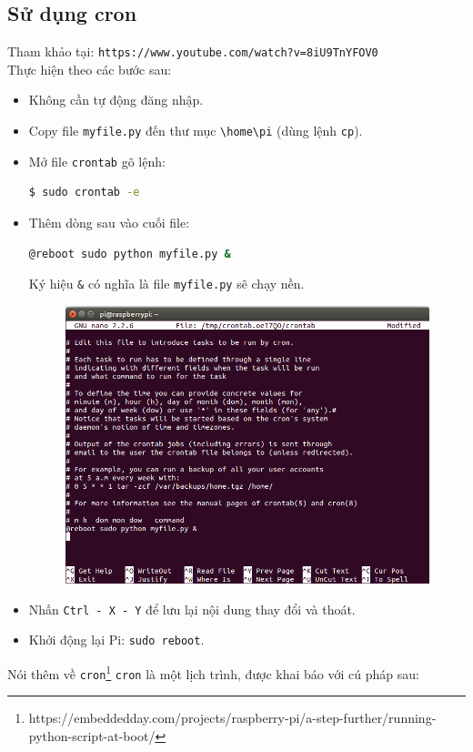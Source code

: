 \subsection{Sử dụng cron}
Tham khảo tại: \verb|https://www.youtube.com/watch?v=8iU9TnYFOV0|\\
Thực hiện theo các bước sau:
\begin{itemize}
\item Không cần tự động đăng nhập.
\item Copy file \verb|myfile.py| đến thư mục \verb|\home\pi| (dùng lệnh \verb|cp|).
\item Mở file \verb|crontab| gõ lệnh:
\begin{lstlisting}[language=bash]
$ sudo crontab -e
\end{lstlisting}
\item Thêm dòng sau vào cuối file: 
\begin{lstlisting}[language=bash]
@reboot sudo python myfile.py &
\end{lstlisting}
Ký hiệu \verb|&| có nghĩa là file \verb|myfile.py| sẽ chạy nền.
\begin{figure}[h!]
\begin{center}
\includegraphics[scale=.5]{run-script-python/images/auto-run-python-1}
\end{center}
\end{figure}
\item Nhấn \verb|Ctrl - X - Y| để lưu lại nội dung thay đổi và thoát.
\item Khởi động lại Pi: \verb|sudo reboot|.
\end{itemize}
Nói thêm về \verb|cron|\footnote{\textsf{https://embeddedday.com/projects/raspberry-pi/a-step-further/running-python-script-at-boot/}} \verb|cron| là một lịch trình, được khai báo với cú pháp sau:
